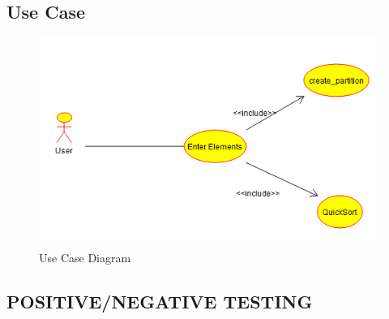 \documentclass[a4paper,12pt]{article}
\begin{document}
{{	\subsection{Use Case}
	\begin{figure}[h!]
		\centering
		\includegraphics[scale=0.80]{quick-sort-use}
		\caption{Use Case Diagram}
		\label{Use Case}
	\end{figure}
	\subsection{ POSITIVE/NEGATIVE TESTING }


}}
\end{document}
